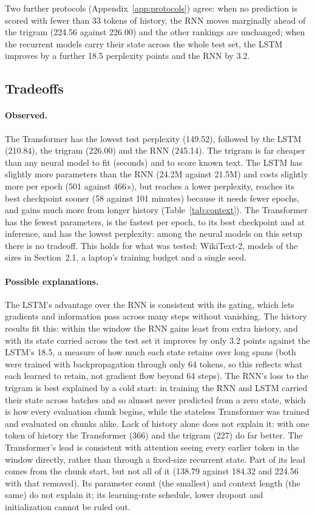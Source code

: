\documentclass[10pt]{article}
\begin{document}
Two further protocols (Appendix~\ref{app:protocols}) agree: when no prediction is scored with fewer than 33 tokens of history, the RNN moves marginally ahead of the trigram (224.56 against 226.00) and the other rankings are unchanged; when the recurrent models carry their state across the whole test set, the LSTM improves by a further 18.5 perplexity points and the RNN by 3.2.

\subsection{Tradeoffs}

\paragraph{Observed.} The Transformer has the lowest test perplexity (149.52), followed by the LSTM (210.84), the trigram (226.00) and the RNN (245.14). The trigram is far cheaper than any neural model to fit (seconds) and to score known text. The LSTM has slightly more parameters than the RNN (24.2M against 21.5M) and costs slightly more per epoch (501 against 466\,s), but reaches a lower perplexity, reaches its best checkpoint sooner (58 against 101 minutes) because it needs fewer epochs, and gains much more from longer history (Table~\ref{tab:context}). The Transformer has the fewest parameters, is the fastest per epoch, to its best checkpoint and at inference, and has the lowest perplexity: among the neural models on this setup there is no tradeoff. This holds for what was tested: WikiText-2, models of the sizes in Section~2.1, a laptop's training budget and a single seed.

\paragraph{Possible explanations.} The LSTM's advantage over the RNN is consistent with its gating, which lets gradients and information pass across many steps without vanishing. The history results fit this: within the window the RNN gains least from extra history, and with its state carried across the test set it improves by only 3.2 points against the LSTM's 18.5, a measure of how much each state retains over long spans (both were trained with backpropagation through only 64 tokens, so this reflects what each learned to retain, not gradient flow beyond 64 steps). The RNN's loss to the trigram is best explained by a cold start: in training the RNN and LSTM carried their state across batches and so almost never predicted from a zero state, which is how every evaluation chunk begins, while the stateless Transformer was trained and evaluated on chunks alike. Lack of history alone does not explain it: with one token of history the Transformer (366) and the trigram (227) do far better. The Transformer's lead is consistent with attention seeing every earlier token in the window directly, rather than through a fixed-size recurrent state. Part of its lead comes from the chunk start, but not all of it (138.79 against 184.32 and 224.56 with that removed). Its parameter count (the smallest) and context length (the same) do not explain it; its learning-rate schedule, lower dropout and initialization cannot be ruled out.
\end{document}
